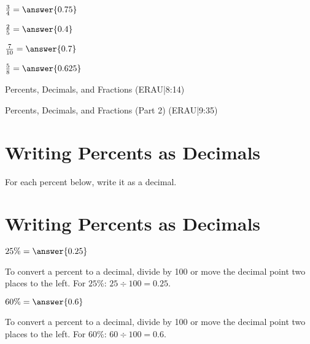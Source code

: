 \documentclass{ximera}
\begin{document}
\begin{problem}
$\frac{3}{4} = \answer{0.75}$
\end{problem}

\begin{problem}
$\frac{2}{5} = \answer{0.4}$
\end{problem}

\begin{problem}
$\frac{7}{10} = \answer{0.7}$
\end{problem}

\begin{problem}
$\frac{5}{8} = \answer{0.625}$
\end{problem}


Percents, Decimals, and Fractions (ERAU|8:14)


Percents, Decimals, and Fractions (Part 2) (ERAU|9:35)



\section*{Writing Percents as Decimals}

For each percent below, write it as a decimal.

\section*{Writing Percents as Decimals}

\begin{problem}
$25\% = \answer{0.25}$

\begin{feedback}
To convert a percent to a decimal, divide by 100 or move the decimal point two places to the left. For $25\%$: $25 \div 100 = 0.25$.
\end{feedback}

\end{problem}

\begin{problem}
$60\% = \answer{0.6}$

\begin{feedback}
To convert a percent to a decimal, divide by 100 or move the decimal point two places to the left. For $60\%$: $60 \div 100 = 0.6$.
\end{feedback}

\end{problem}
\end{document}
